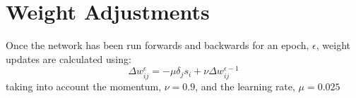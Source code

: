 \documentclass[a4paper,10pt]{article}
\begin{document}
\section{Weight Adjustments}
Once the network has been run forwards and backwards for an epoch, $\epsilon$, weight updates are calculated using:
\begin{equation}
\label{eq:ff_adjusting_weights}
\Delta w_{ij}^{\epsilon} = - \mu \delta_j s_i + \nu \Delta w_{ij}^{\epsilon-1}
\end{equation}
taking into account the momentum, $\nu = 0.9$, and the learning rate, $\mu = 0.025$

% 




\end{document}
